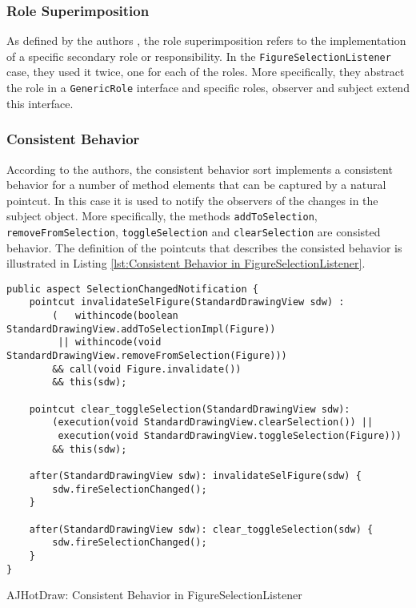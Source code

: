 \subsubsection{Role Superimposition}
As defined by the authors \cite{marin2005classification}, the role superimposition refers to the implementation of a specific secondary role or responsibility.
In the \texttt{FigureSelectionListener} case, they used it twice, one for each of the roles.
More specifically, they abstract the role in a \texttt{GenericRole} interface and specific roles, observer and subject extend this interface.

\subsubsection{Consistent Behavior}
According to the authors\cite{marin2005classification}, the consistent behavior sort implements a consistent behavior for a number of method elements that can be captured by a natural pointcut.
In this case it is used to notify the observers of the changes in the subject object.
More specifically, the methods \texttt{addToSelection}, \texttt{removeFromSelection}, \texttt{toggleSelection} and \texttt{clearSelection} are consisted behavior.
The definition of the pointcuts that describes the consisted behavior is illustrated in Listing \ref{lst:Consistent Behavior in FigureSelectionListener}.

\begin{sourcecode} [H]
	\begin{lstlisting}[language=AspectJ, escapechar=|]
public aspect SelectionChangedNotification {
	pointcut invalidateSelFigure(StandardDrawingView sdw) :
		(   withincode(boolean StandardDrawingView.addToSelectionImpl(Figure)) 
		 || withincode(void StandardDrawingView.removeFromSelection(Figure)))
		&& call(void Figure.invalidate()) 
		&& this(sdw);

	pointcut clear_toggleSelection(StandardDrawingView sdw):
		(execution(void StandardDrawingView.clearSelection()) ||
		 execution(void StandardDrawingView.toggleSelection(Figure)))
		&& this(sdw);

	after(StandardDrawingView sdw): invalidateSelFigure(sdw) {
		sdw.fireSelectionChanged();
	}

	after(StandardDrawingView sdw): clear_toggleSelection(sdw) {
		sdw.fireSelectionChanged();
	}
}
	\end{lstlisting}
	\caption{AJHotDraw: Consistent Behavior in FigureSelectionListener}
	\label{lst:Consistent Behavior in FigureSelectionListener}
\end{sourcecode}

